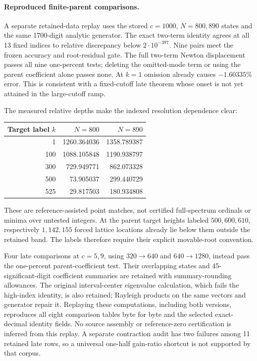 \paragraph{Reproduced finite-parent comparisons.}
A separate retained-data replay uses the stored $c=1000$, $N=800,890$
states and the same 1700-digit analytic generator. The exact two-term
identity agrees at all 13 fixed indices to relative discrepancy below
$2\cdot10^{-397}$. Nine pairs meet the frozen accuracy and root-residual
gate. The full two-term Newton displacement passes all nine one-percent
tests; deleting the omitted-mode term or using the parent coefficient
alone passes none. At $k=1$ omission already causes $-1.60335\%$ error.
This is consistent with a fixed-cutoff late theorem whose onset is not
yet attained in the large-cutoff ramp.

The measured relative depths make the indexed resolution dependence clear:
\begin{center}\small
\begin{tabular}{@{}rrr@{}}
\toprule
Target label $k$ & $N=800$ & $N=890$\\
\midrule
1 & 1260.364036 & 1358.789387\\
100 & 1088.105848 & 1190.938797\\
300 & 729.949771 & 862.073328\\
500 & 73.905037 & 299.440729\\
525 & 29.817503 & 180.934808\\
\bottomrule
\end{tabular}
\end{center}
These are reference-assisted point matches, not certified full-spectrum
ordinals or minima over untested integers. At the parent target heights
labeled $500,600,610$, respectively $1,142,155$ forced lattice locations
already lie below them outside the retained band. The labels therefore
require their explicit movable-root convention.

Four late comparisons at $c=5,9$, using $320\to640$ and $640\to1280$,
instead pass the one-percent parent-coefficient test. Their overlapping
states and 45-significant-digit coefficient summaries are retained with
summary-rounding allowances. The original interval-center eigenvalue
calculation, which fails the high-index identity, is also retained;
Rayleigh products on the same vectors and generator repair it. Replaying
these computations, including both versions, reproduces all eight
comparison tables byte for byte and the selected exact-decimal identity
fields. No source assembly or reference-zero certification is inferred
from this replay. A separate contraction audit has two failures among
11 retained late rows, so a universal one-half gain-ratio shortcut is
not supported by that corpus.
